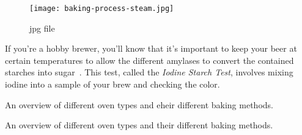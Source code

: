 \documentclass[paper=a4, twoside=false, fontsize=12pt, parskip=half,
                bibliography=totoc, listof=totoc]{scrbook}
\begin{document}
\begin{figure}[!htb]
  \texttt{[image: baking-process-steam.jpg]}
  \caption[Steam building with inverted tray]{jpg file}%
      \label{flc:inverted-tray}
\end{figure}
If you're a hobby brewer, you'll know that it's important to keep your beer at
certain temperatures to allow the different amylases to convert the contained
starches into sugar~\cite{beer+amylase}.
This test, called the \emph{Iodine Starch Test}, involves mixing iodine into
a sample of your brew and checking the color.

\begin{table}[!htb]
    \begin{center}
        
        \caption[Different oven types]{An overview of different oven types and
        eheir different baking methods.}
    \end{center}
\end{table}

\begin{table}[!htb]
    \begin{center}
        
        \caption[Different oven types]{An overview of different oven types and their
            different baking methods.}
    \end{center}
\end{table}
\end{document}
